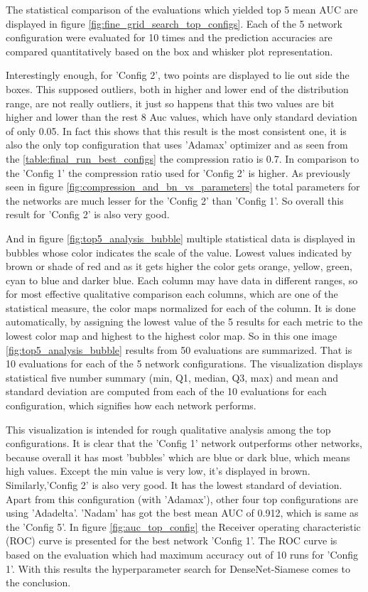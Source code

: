 The statistical comparison of the evaluations which yielded top 5 mean AUC are displayed in figure \ref{fig:fine_grid_search_top_configs}. Each of the 5 network configuration were evaluated for 10 times and the prediction accuracies 
are compared quantitatively based on the box and whisker plot representation.

Interestingly enough, for 'Config 2', two points are displayed to lie out side the boxes. This supposed outliers, both in higher and lower end of the distribution range, are not really outliers, it just so happens that this 
two values are bit higher and lower than the rest 8 Auc values, which have only standard deviation of only 0.05. In fact this shows that this result is the most consistent one, it is also the only top configuration that uses 'Adamax' 
optimizer and as seen from the \ref{table:final_run_best_configs} the compression ratio is 0.7. In comparison to the 'Config 1' the compression ratio used for 'Config 2' is higher. As previously seen in figure 
\ref{fig:compression_and_bn_vs_parameters} the total parameters for the networks are much lesser for the 'Config 2' than 'Config 1'. So overall this result for 'Config 2' is also very good.


And in figure \ref{fig:top5_analysis_bubble} multiple statistical data is displayed in bubbles 
whose color indicates the scale of the value. Lowest values indicated by brown or shade of red and as it gets higher the color gets orange, yellow, green, cyan to blue and darker blue. Each column may have data in different ranges, 
so for most effective qualitative comparison each columns, which are one of the statistical measure, the color maps normalized for each of the column. It is done automatically, by assigning the lowest value of the 5 results for each metric
to the lowest color map and highest to the highest color map. So in this one image \ref{fig:top5_analysis_bubble} results from 50 evaluations are summarized. That is 10 evaluations for each of the 5 network configurations. 
The visualization displays statistical five number summary (min, Q1, median, Q3, max) and mean and standard deviation are computed from each of the 10 evaluations for each configuration, which signifies how each network performs. 

This visualization is intended for rough qualitative analysis among the top configurations. It is clear that the 'Config 1' network outperforms other networks, because overall it has most 'bubbles' which are blue or dark blue,
which means high values. Except the min value is very low, it's displayed in brown. Similarly,'Config 2' is also very good. 
It has the lowest standard of deviation. Apart from this configuration (with 'Adamax'), other four top configurations are using 'Adadelta'. 'Nadam' has got the best mean AUC of 0.912, which is same as the 'Config 5'. 
In figure \ref{fig:auc_top_config} the Receiver operating characteristic (ROC) curve is presented for the best network 'Config 1'. The ROC curve is based on the evaluation which had maximum accuracy out of 10 runs for 'Config 1'.
With this results the hyperparameter search for DenseNet-Siamese comes to the conclusion.

